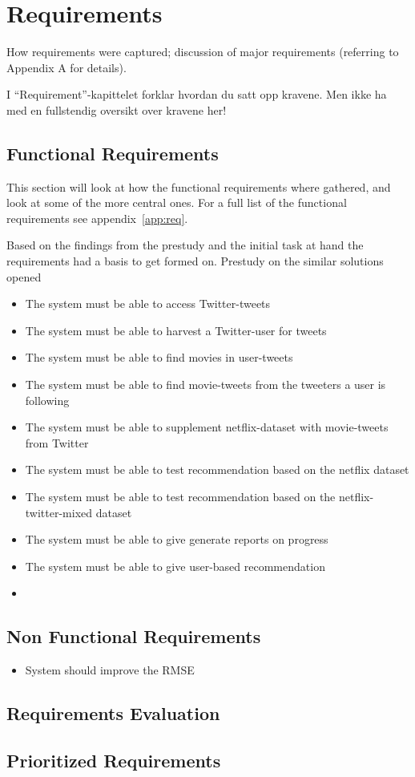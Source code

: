 
\chapter{Requirements}

\minitoc

How requirements  were  captured;
  discussion  of  major requirements
(referring  to  Appendix  A for details).

I “Requirement”-kapittelet forklar hvordan du satt opp kravene.
Men ikke ha med en fullstendig oversikt over kravene her!


\clearpage

\section{Functional Requirements}
This section will look at how the functional requirements where gathered, and look at some of the more central ones. For a full list of the functional requirements see appendix~\ref{app:req}.

Based on the findings from the prestudy and the initial task at hand the requirements had a basis to get formed on. Prestudy on the similar solutions opened

\begin{itemize}
  \item The system must be able to access Twitter-tweets
  \item The system must be able to harvest a Twitter-user for tweets
  \item The system must be able to find movies in user-tweets
  \item The system must be able to find movie-tweets from the tweeters a user is following

  \item The system must be able to supplement netflix-dataset with movie-tweets from Twitter
  \item The system must be able to test recommendation based on the netflix dataset
  \item The system must be able to test recommendation based on the netflix-twitter-mixed dataset
  \item The system must be able to give generate reports on progress
  \item The system must be able to give user-based recommendation
  \item
\end{itemize}

\section{Non Functional Requirements}

\begin{itemize}
  \item System should improve the RMSE
\end{itemize}


\section{Requirements Evaluation}


\section{Prioritized Requirements}

